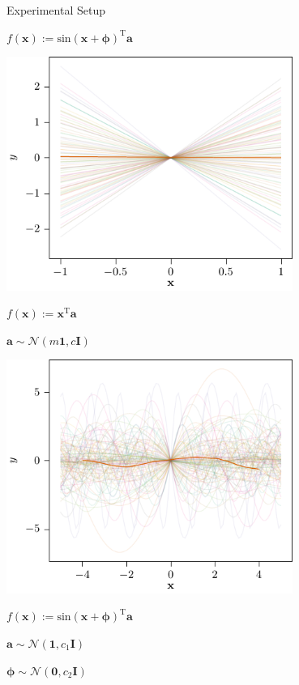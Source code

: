 \documentclass[aspectratio=169]{beamer}
\begin{document}
\begin{frame}{Experimental Setup}
{\begin{minipage}{\textwidth}
\begin{minipage}{0.5\textwidth}
    $f(\mathbf{x}):=\text{sin}(\mathbf{x}+\boldsymbol{\phi})^{\text{T}}\mathbf{a}$
    \end{minipage}
  \end{minipage}
  }
  {
  \begin{minipage}{\textwidth}
    \begin{minipage}{0.5\textwidth}
      \centering
      \includegraphics[width=0.7\textwidth]{figures/lin_maml}

    $f(\mathbf{x}):=\mathbf{x}^\text{T}\mathbf{a}$


    $\mathbf{a} \sim \mathcal{N}(m\mathbf{1}, c\mathbf{I})$
    \end{minipage}%
    \begin{minipage}{0.5\textwidth}
      \centering
      \includegraphics[width=0.7\textwidth]{figures/nonlin_maml}

    $f(\mathbf{x}):=\text{sin}(\mathbf{x}+\boldsymbol{\phi})^{\text{T}}\mathbf{a}$

   
    $\mathbf{a} \sim \mathcal{N}(\mathbf{1}, c_1\mathbf{I})$


    $\boldsymbol{\phi} \sim \mathcal{N}(\mathbf{0}, c_2\mathbf{I})$


\end{minipage}
\end{minipage}}
\end{frame}
\end{document}
